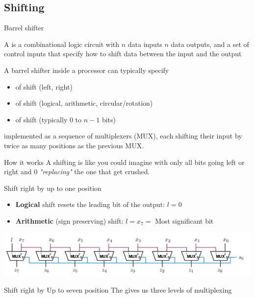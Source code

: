 \subsection{Shifting}
\begin{parag}{Barrel shifter}
    \begin{definition}
        A  is a combinational logic circuit with $n$ data inputs $n$ data outputs, and a set of control inputs that specify how to shift data between the input and the output
    \end{definition}
    A barrel shifter inside a processor can typically specify
    \begin{itemize}
        \item {} of shift (left, right)
        \item {} of shift (logical, arithmetic, circular/rotation)
        \item {} of shift (typically $0$ to $n-1$ bits)
    \end{itemize}
    implemented as a sequence of multiplexers (MUX), each shifting their input by twice as many positions as the previous MUX.
\begin{subparag}{How it works}
    A shifting is like you could imagine with only all bits going left or right and $0$ \textit{"replacing"} the one that get crushed.
\end{subparag}
\begin{subparag}{Shift right by up to one position}
    \begin{itemize}
        \item \textbf{Logical} shift resets the leading bit of the output: $l = 0$
        \item \textbf{Arithmetic} (sign preserving) shift: $l=x_7 = $ Most significant bit
    \end{itemize}
    \begin{center}
        \includegraphics[scale=0.3]{22025-03-17.png}
    \end{center}
\end{subparag}
\begin{subparag}{Shift right by Up to seven position}
    The gives us three levels of multiplexing
    \begin{center}

\end{center}
\end{subparag}
\end{parag}

